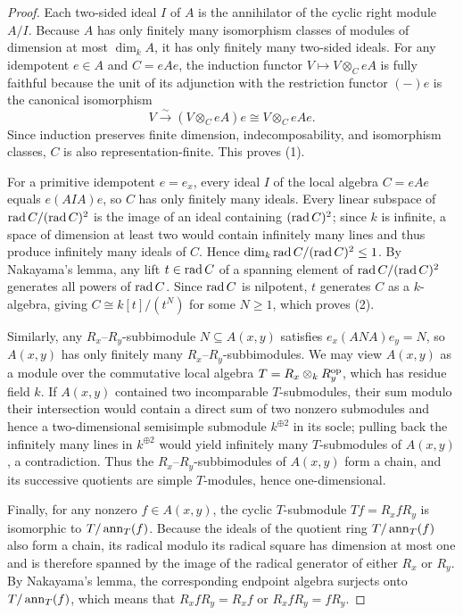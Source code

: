 \begin{proof}
Each two-sided ideal $I$ of $A$ is the annihilator of the cyclic right module
$A/I$. Because $A$ has only finitely many isomorphism classes of modules of
dimension at most $\dim_k A$, it has only finitely many two-sided ideals.
For any idempotent $e\in A$ and $C=eAe$, the induction functor
$V\mapsto V\otimes_C eA$ is fully faithful because the unit of its
adjunction with the restriction functor $(-)e$ is the canonical isomorphism
\[
 V\xrightarrow{\sim}(V\otimes_C eA)e\cong V\otimes_C eAe.
\]
Since induction preserves finite dimension, indecomposability, and
isomorphism classes, $C$ is also representation-finite. This proves (1).

For a primitive idempotent $e=e_x$, every ideal $I$ of the local algebra
$C=eAe$ equals $e(AIA)e$, so $C$ has only finitely many ideals. Every linear
subspace of $\operatorname{rad} C/(\operatorname{rad} C)^2$ is the image of an ideal containing
$(\operatorname{rad} C)^2$; since $k$ is infinite, a space of dimension at least two would
contain infinitely many lines and thus produce infinitely many ideals of $C$.
Hence $\dim_k\operatorname{rad} C/(\operatorname{rad} C)^2\leq1$. By Nakayama's lemma, any lift
$t\in\operatorname{rad} C$ of a spanning element of $\operatorname{rad} C/(\operatorname{rad} C)^2$ generates all
powers of $\operatorname{rad} C$. Since $\operatorname{rad} C$ is nilpotent, $t$ generates $C$ as a
$k$-algebra, giving $C\cong k[t]/(t^N)$ for some $N\geq1$, which proves (2).

Similarly, any $R_x$--$R_y$-subbimodule $N\subseteq A(x,y)$ satisfies
$e_x(ANA)e_y=N$, so $A(x,y)$ has only finitely many
$R_x$--$R_y$-subbimodules. We may view $A(x,y)$ as a module over the
commutative local algebra $T=R_x\otimes_k R_y^{\mathrm{op}}$, which has residue
field $k$. If $A(x,y)$ contained two incomparable $T$-submodules, their sum
modulo their intersection would contain a direct sum of two nonzero
submodules and hence a two-dimensional semisimple submodule $k^{\oplus 2}$
in its socle; pulling back the infinitely many lines in $k^{\oplus 2}$ would
yield infinitely many $T$-submodules of $A(x,y)$, a contradiction. Thus the
$R_x$--$R_y$-subbimodules of $A(x,y)$ form a chain, and its successive
quotients are simple $T$-modules, hence one-dimensional.

Finally, for any nonzero $f\in A(x,y)$, the cyclic $T$-submodule
$Tf=R_xfR_y$ is isomorphic to $T/\operatorname{ann}_T(f)$. Because the ideals of the
quotient ring $T/\operatorname{ann}_T(f)$ also form a chain, its radical modulo its
radical square has dimension at most one and is therefore spanned by the
image of the radical generator of either $R_x$ or $R_y$. By Nakayama's
lemma, the corresponding endpoint algebra surjects onto $T/\operatorname{ann}_T(f)$, which
means that $R_xfR_y=R_xf$ or $R_xfR_y=fR_y$.
\end{proof}

